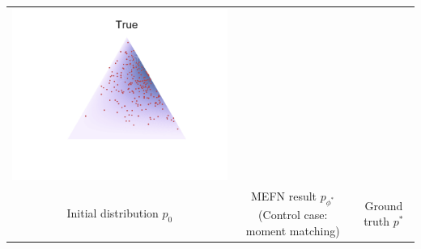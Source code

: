 \documentclass[16pt,presentation]{beamer}
\begin{document}
\begin{frame}
\begin{tabular}[t]{ccc}
\includegraphics[scale=0.3,clip = true, trim=1cm 1.5cm 1cm 1.5cm]{figs/MEFN/true_contours.pdf}\\
{\scriptsize Initial distribution $p_0$}& \parbox{0.3\textwidth}{\scriptsize MEFN result $p_{\phi^*}$ (Control case: moment matching)}&{\scriptsize Ground truth $p^*$}\\
\end{tabular}
\end{frame}
\end{document}
